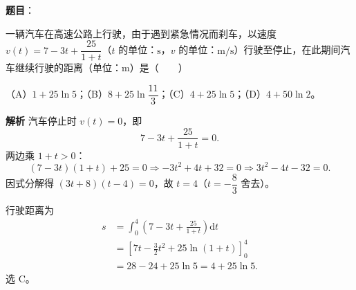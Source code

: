 \begin{answer}

\textbf{题目}：

一辆汽车在高速公路上行驶，由于遇到紧急情况而刹车，以速度 $v(t)=7-3t+\dfrac{25}{1+t}$（$t$ 的单位：$\mathrm s$，$v$ 的单位：$\mathrm{m/s}$）行驶至停止，在此期间汽车继续行驶的距离（单位：$\mathrm m$）是\mbox{（　　）}

（A）$1+25\ln5$；（B）$8+25\ln\dfrac{11}{3}$；（C）$4+25\ln5$；（D）$4+50\ln2$。

\textbf{解析}
汽车停止时 $v(t)=0$，即
\nopagebreak[4]
\[7-3t+\frac{25}{1+t}=0.\]
两边乘 $1+t>0$：
\nopagebreak[4]
\[(7-3t)(1+t)+25=0
\Longrightarrow -3t^2+4t+32=0
\Longrightarrow 3t^2-4t-32=0.\]
因式分解得 $(3t+8)(t-4)=0$，故 $t=4$（$t=-\dfrac83$ 舍去）。

行驶距离为
\nopagebreak[4]
\[\begin{aligned}
s&=\int_0^4\left(7-3t+\frac{25}{1+t}\right)\mathrm dt\\
&=\left[7t-\frac32t^2+25\ln(1+t)\right]_0^4\\
&=28-24+25\ln5=4+25\ln5.
\end{aligned}\]
选 C。


\end{answer}
